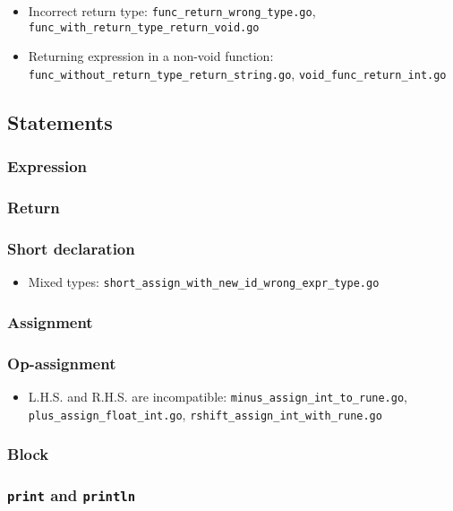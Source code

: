 \documentclass{article}
\begin{document}
\begin{itemize}
\item Incorrect return type: \texttt{func_return_wrong_type.go}, \texttt{func_with_return_type_return_void.go}
\item Returning expression in a non-void function: \texttt{func_without_return_type_return_string.go}, \texttt{void_func_return_int.go}
\end{itemize}

\subsection*{Statements}

\subsubsection*{Expression}
\subsubsection*{Return}
\subsubsection*{Short declaration}

\begin{itemize}
\item Mixed types: \texttt{short_assign_with_new_id_wrong_expr_type.go}
\end{itemize}

\subsubsection*{Assignment}
\subsubsection*{Op-assignment}

\begin{itemize}
\item L.H.S. and R.H.S. are incompatible: \texttt{minus_assign_int_to_rune.go}, \texttt{plus_assign_float_int.go}, \texttt{rshift_assign_int_with_rune.go}
\end{itemize}

\subsubsection*{Block}
\subsubsection*{\texttt{print} and \texttt{println}}
\end{document}

